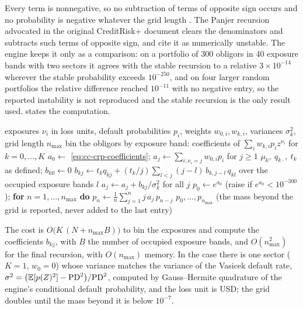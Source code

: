 Every term is nonnegative, so no subtraction of terms of opposite sign occurs and no probability is negative whatever the grid length
\citep{credit-capital:haaf2004}. The Panjer recursion advocated in the original CreditRisk+ document clears the denominators and subtracts
such terms of opposite sign, and \citet{credit-capital:haaf2004} cite it as numerically unstable. The engine keeps it
only as a comparison: on a portfolio of 300 obligors in 40 exposure bands with two sectors it agrees with the stable recursion to a relative
$3\times10^{-14}$ wherever the stable probability exceeds $10^{-250}$, and on four larger random portfolios the relative difference reached
$10^{-11}$ with no negative entry, so the reported instability is not reproduced and the stable recursion is the only result used.
 states the computation.

\begin{algorithm}[htbp]
\caption{Stable CreditRisk+ recursion for the loss distribution on an integer grid of loss units.}
\label{alg:cc-crp}
\begin{algorithmic}[1]
\Require exposures $\nu_i$ in loss units, default probabilities $p_i$, weights $w_{0,i},w_{k,i}$, variances $\sigma_k^2$, grid length $n_{\max}$
\State bin the obligors by exposure band: coefficients of $\sum_i w_{k,i}p_i z^{\nu_i}$ for $k=0,\dots,K$
\State $a_0\gets$ \cref{eq:cc-crp-coefficients}; $a_j\gets\sum_{i:\nu_i=j}w_{0,i}p_i$ for $j\ge1$
\State $\mu_k,\ q_{k\cdot},\ t_k$ as defined; $b_{k0}\gets0$
\State $b_{kj}\gets t_kq_{kj}+(t_k/j)\sum_{l<j}(j-l)\,b_{k,j-l}\,q_{kl}$ over the occupied exposure bands $l$
\EndFor
\State $a_j\gets a_j+b_{kj}/\sigma_k^2$ for all $j$
\EndFor
\State $p_0\gets e^{a_0}$ (raise if $e^{a_0}<10^{-300}$); \textbf{for} $n=1,\dots,n_{\max}$ \textbf{do} $p_n\gets\frac1n\sum_{j=1}^{n}j\,a_j\,p_{n-j}$
\State \Return $p_0,\dots,p_{n_{\max}}$ (the mass beyond the grid is reported, never added to the last entry)
\end{algorithmic}
\end{algorithm}

The cost is $O\big(K\,(N+n_{\max}B)\big)$ to bin the exposures and compute the coefficients $b_{kj}$, with $B$ the number of occupied
exposure bands, and $O(n_{\max}^2)$ for the final recursion, with $O(n_{\max})$ memory. In the case there is one sector ($K=1$, $w_0=0$) whose variance matches the variance of
the Vasicek default rate, $\sigma^2=\big(\mathbb{E}[p(Z)^2]-\mathrm{PD}^2\big)/\mathrm{PD}^2$, computed by Gauss--Hermite quadrature of the engine's conditional
default probability, and the loss unit is \ccLossUnit{} USD; the grid doubles until the mass beyond it is below $10^{-7}$.

